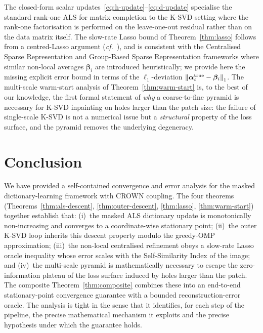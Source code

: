 \documentclass[journal,onecolumn,11pt]{IEEEtran}
\theoremstyle{definition}
\newcommand{\norm}[1]{\left\lVert #1 \right\rVert}
\newcommand{\alphavec}{\bm{\alpha}}
\begin{document}
The closed-form scalar updates~\eqref{eq:h-update}--\eqref{eq:d-update}
specialise the standard rank-one ALS for matrix completion
\cite{jain2013low} to the K-SVD setting where the rank-one factorisation
is performed on the leave-one-out residual rather than on the data
matrix itself. The slow-rate Lasso bound of Theorem~\ref{thm:lasso}
follows from a centred-Lasso argument
(\emph{cf.}\ \cite{bickel2009simultaneous,negahban2012unified}), and is
consistent with the Centralised Sparse Representation
\cite{dong2011centralized} and Group-Based Sparse Representation
\cite{zhang2014groupbased} frameworks where similar non-local averages
$\bm{\beta}_i$ are introduced heuristically; we provide here the missing
explicit error bound in terms of the $\ell_1$-deviation
$\norm{\alphavec_i^{\rm true}-\bm{\beta}_i}_1$. The multi-scale warm-start
analysis of Theorem~\ref{thm:warm-start} is, to the best of our
knowledge, the first formal statement of \emph{why} a coarse-to-fine
pyramid is necessary for K-SVD inpainting on holes larger than the
patch size: the failure of single-scale K-SVD is not a numerical issue
but a \emph{structural} property of the loss surface, and the pyramid
removes the underlying degeneracy.

\section{Conclusion}

We have provided a self-contained convergence and error analysis for
the masked dictionary-learning framework with CROWN coupling. The four
theorems (Theorems~\ref{thm:als-descent}, \ref{thm:outer-descent},
\ref{thm:lasso}, \ref{thm:warm-start}) together establish that:
(i)~the masked ALS dictionary update is monotonically non-increasing
and converges to a coordinate-wise stationary point;
(ii)~the outer K-SVD loop inherits this descent property modulo the
greedy-OMP approximation;
(iii)~the non-local centralised refinement obeys a slow-rate Lasso
oracle inequality whose error scales with the Self-Similarity Index of
the image; and
(iv)~the multi-scale pyramid is mathematically necessary to escape the
zero-information plateau of the loss surface induced by holes larger
than the patch. The composite Theorem~\ref{thm:composite} combines
these into an end-to-end stationary-point convergence guarantee with a
bounded reconstruction-error oracle. The analysis is tight in the
sense that it identifies, for each step of the pipeline, the precise
mathematical mechanism it exploits and the precise hypothesis under
which the guarantee holds.
\end{document}
